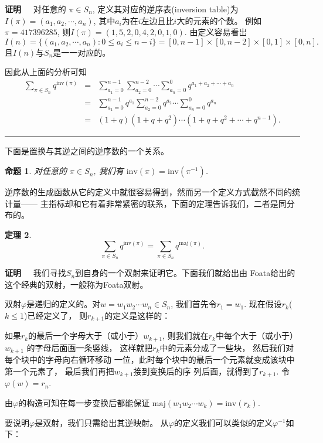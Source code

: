 \documentclass[a4paper,11pt,twoside]{book}
\newtheorem{thm}{定理}[section]
\newtheorem{prop}[thm]{命题}
\def\qed{\nopagebreak\hfill{\rule{4pt}{7pt}}\medbreak}
\def\pf{{\bf 证明~~ }}
\def \maj{\mathrm{maj}}
\def \inv{\mathrm{inv}}
\begin{document}
\pf 对任意的 $\pi \in S_n$, 定义其对应的逆序表(inversion table)为
$I(\pi)=(a_1,a_2,\cdots,a_n)$,
其中$a_i$为在$i$左边且比$i$大的元素的个数。
例如 $\pi=417396285$, 则$I(\pi)=(1,5,2,0,4,2,0,1,0)$.
由定义容易看出
\[I(n)=\{(a_1,a_2,\cdots,a_n): 0\leq a_i \leq n-i\}=
[0,n-1]\times [0,n-2] \times [0,1]\times [0,n].\]
且$I(n)$与$S_n$是一一对应的。

因此从上面的分析可知
\begin{eqnarray*}
\sum_{\pi\in S_n}q^{\inv(\pi)}
&=&\sum_{a_1=0}^{n-1}\sum_{a_2=0}^{n-2}\cdots
\sum_{a_n=0}^{0}q^{a_1+a_2+\cdots+a_n}\\
&=& \sum_{a_1=0}^{n-1}q^{a_1}\sum_{a_2=0}^{n-2}q^{a_2} \cdots
\sum_{a_n=0}^{0}q^{a_n}\\
&=&(1+q)(1+q+q^2)\cdots(1+q+q^2+\cdots+q^{n-1}).
\end{eqnarray*}
\qed

下面是置换与其逆之间的逆序数的一个关系。
\begin{prop}
对任意的 $\pi \in S_n$, 我们有 $\inv(\pi)=\inv(\pi^{-1})$.
\end{prop}

逆序数的生成函数从它的定义中就很容易得到，然而另一个定义方式截然不同的统计量——
主指标却和它有着非常紧密的联系，下面的定理告诉我们，二者是同分布的。

\begin{thm}
\begin{equation}
\sum_{\pi\in S_n}q^{\inv(\pi)}=\sum_{\pi\in S_n}q^{\maj(\pi)}.
\end{equation}
\end{thm}

\pf
我们寻找$S_n$到自身的一个双射来证明它。下面我们就给出由
Foata给出的这个经典的双射，一般称为Foata双射。

双射$\varphi$是递归的定义的。对$w=w_1w_2\cdots w_n \in S_n$,
我们首先令$r_1=w_1$. 现在假设$r_k$($k\leq 1$)已经定义了，
则$r_{k+1}$的定义是这样的：

如果$r_k$的最后一个字母大于（或小于）$w_{k+1}$,
则我们就在$r_k$中每个大于（或小于）$w_{k+1}$ 的字母后面画一条竖线，
这样就把$r_k$中的元素分成了一些块，
然后我们对每个块中的字母向右循环移动
一位，此时每个块中的最后一个元素就变成该块中第一个元素了，
最后我们再把$w_{k+1}$接到变换后的序
列后面，就得到了$r_{k+1}$. 令$\varphi(w)=r_n$.

由$\varphi$的构造可知在每一步变换后都能保证
$\maj(w_1w_2\cdots w_k)=\inv(r_k)$.　

要说明$\varphi$是双射，我们只需给出其逆映射。
从$\varphi$的定义我们可以类似的定义$\varphi^{-1}$如下：
\end{document}
